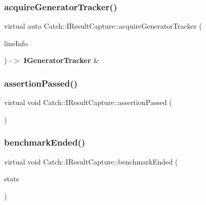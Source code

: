 \subsubsection{acquireGeneratorTracker()}
{\footnotesize\ttfamily virtual auto Catch\+::\+I\+Result\+Capture\+::acquire\+Generator\+Tracker (\begin{DoxyParamCaption}\item[{\textbf{ Source\+Line\+Info} const \&}]{line\+Info }\end{DoxyParamCaption}) -\/$>$  \textbf{ I\+Generator\+Tracker} \&\hspace{0.3cm}{\ttfamily [pure virtual]}}

\mbox{\label{struct_catch_1_1_i_result_capture_a9b0ef2cb071e9a9dc6ec1b533026aea7}} 
\subsubsection{assertionPassed()}
{\footnotesize\ttfamily virtual void Catch\+::\+I\+Result\+Capture\+::assertion\+Passed (\begin{DoxyParamCaption}{ }\end{DoxyParamCaption})\hspace{0.3cm}{\ttfamily [pure virtual]}}

\mbox{\label{struct_catch_1_1_i_result_capture_a6e5e64f9d94211a888249012ab6cc7fb}} 
\subsubsection{benchmarkEnded()}
{\footnotesize\ttfamily virtual void Catch\+::\+I\+Result\+Capture\+::benchmark\+Ended (\begin{DoxyParamCaption}\item[{Benchmark\+Stats const \&}]{stats }\end{DoxyParamCaption})\hspace{0.3cm}{\ttfamily [pure virtual]}}

\mbox{\label{struct_catch_1_1_i_result_capture_a264ae12330c74b2daae41715a30d51bf}} 
